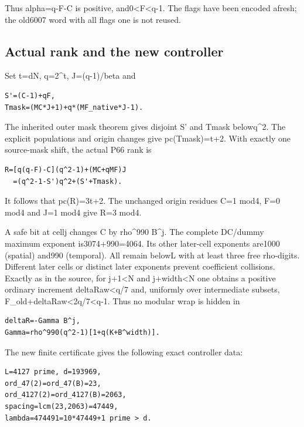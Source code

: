 Thus alpha=q-F-C is positive, and0<F<q-1. The flags have been encoded afresh; the old6007 word with all flags one is not reused.

\subsection{Actual rank and the new controller}
Set t=dN, q=2\textasciicircum{}t, J=(q-1)/beta and

\begin{Verbatim}[fontsize=\small,breaklines=true,breakanywhere=true,breaksymbolleft={}]
S'=(C-1)+qF,
Tmask=(MC*J+1)+q*(MF_native*J-1).
\end{Verbatim}

The inherited outer mask theorem gives disjoint S' and Tmask belowq\textasciicircum{}2. The explicit populations and origin changes give pc(Tmask)=t+2. With exactly one source-mask shift, the actual P66 rank is

\begin{Verbatim}[fontsize=\small,breaklines=true,breakanywhere=true,breaksymbolleft={}]
R=[q(q-F)-C](q^2-1)+(MC+qMF)J
  =(q^2-1-S')q^2+(S'+Tmask).
\end{Verbatim}

It follows that pc(R)=3t+2. The unchanged origin residues C=1 mod4, F=0 mod4 and J=1 mod4 give R=3 mod4.

A safe bit at cellj changes C by rho\textasciicircum{}990 B\textasciicircum{}j. The complete DC/dummy maximum exponent is3074+990=4064. Its other later-cell exponents are1000 (spatial) and990 (temporal). All remain belowL with at least three free rho-digits. Different later cells or distinct later exponents prevent coefficient collisions. Exactly as in the source, for j+1<N and j+width<N one obtains a positive ordinary increment deltaRaw<q/7 and, uniformly over intermediate subsets, F\_old+deltaRaw<2q/7<q-1. Thus no modular wrap is hidden in

\begin{Verbatim}[fontsize=\small,breaklines=true,breakanywhere=true,breaksymbolleft={}]
deltaR=-Gamma B^j,
Gamma=rho^990(q^2-1)[1+q(K+B^width)].
\end{Verbatim}

The new finite certificate gives the following exact controller data:

\begin{Verbatim}[fontsize=\small,breaklines=true,breakanywhere=true,breaksymbolleft={}]
L=4127 prime, d=193969,
ord_47(2)=ord_47(B)=23,
ord_4127(2)=ord_4127(B)=2063,
spacing=lcm(23,2063)=47449,
lambda=474491=10*47449+1 prime > d.
\end{Verbatim}

